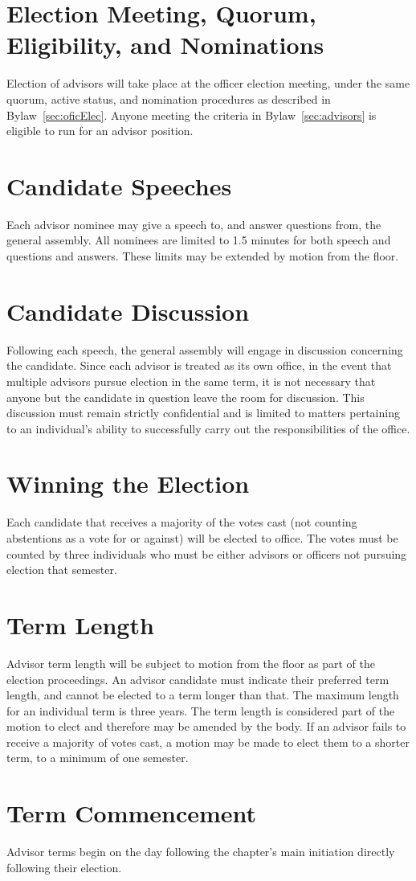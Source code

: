 \section{Election Meeting, Quorum, Eligibility, and Nominations}
Election of advisors will take place at the officer election meeting, under the same quorum, active status, and nomination procedures as described in Bylaw~\ref{sec:oficElec}.
Anyone meeting the criteria in Bylaw~\ref{sec:advisors} is eligible to run for an advisor position.
\section{Candidate Speeches}
Each advisor nominee may give a speech to, and answer questions from, the general assembly.
All nominees are limited to 1.5 minutes for both speech and questions and answers.
These limits may be extended by motion from the floor.
\section{Candidate Discussion}
Following each speech, the general assembly will engage in discussion concerning the candidate.
Since each advisor is treated as its own office, in the event that multiple advisors pursue election in the same term, it is not necessary that anyone but the candidate in question leave the room for discussion.
This discussion must remain strictly confidential and is limited to matters pertaining to an individual's ability to successfully carry out the responsibilities of the office.
\section{Winning the Election}
Each candidate that receives a majority of the votes cast (not counting abstentions as a vote for or against) will be elected to office.
The votes must be counted by three individuals who must be either advisors or officers not pursuing election that semester.
\section{Term Length}
\label{sec:advisorLength} Advisor term length will be subject to motion from the floor as part of the election proceedings.
An advisor candidate must indicate their preferred term length, and cannot be elected to a term longer than that.
The maximum length for an individual term is three years.
The term length is considered part of the motion to elect and therefore may be amended by the body.
If an advisor fails to receive a majority of votes cast, a motion may be made to elect them to a shorter term, to a minimum of one semester.
\section{Term Commencement}
Advisor terms begin on the day following the chapter's main initiation directly following their election.